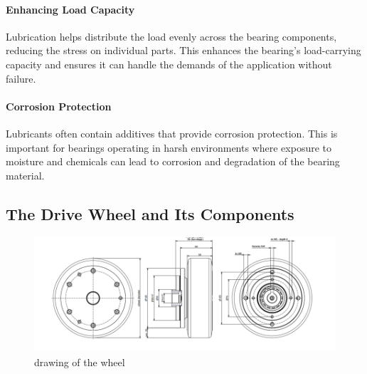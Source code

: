 \documentclass[../../main]{subfiles}
\begin{document}
\paragraph{Enhancing Load Capacity}
Lubrication helps distribute the load evenly across the bearing components, reducing the stress on individual parts. This enhances the bearing's load-carrying capacity and ensures it can handle the demands of the application without failure.

\paragraph{Corrosion Protection}
Lubricants often contain additives that provide corrosion protection. This is important for bearings operating in harsh environments where exposure to moisture and chemicals can lead to corrosion and degradation of the bearing material.


\subsection{The Drive Wheel and Its Components}

\begin{figure}
  \centering
  \includegraphics[width=\textwidth]{img/Picture1.png}
  \caption{drawing of the wheel}
  \label{wheel}
\end{figure}
\end{document}
